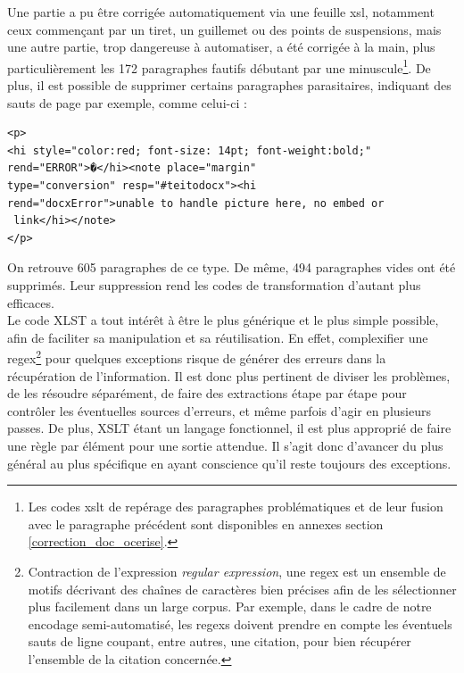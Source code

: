 \documentclass[a4paper,12pt,twoside]{book}
\begin{document}
Une partie a pu être corrigée automatiquement via une feuille xsl, notamment ceux commençant par un tiret, un guillemet ou des points de suspensions, mais une autre partie, trop dangereuse à automatiser, a été corrigée à la main, plus particulièrement les 172 paragraphes fautifs débutant par une minuscule\footnote{Les codes xslt de repérage des paragraphes problématiques et de leur fusion avec le paragraphe précédent sont disponibles en annexes section \ref{correction_doc_ocerise}.}.
De plus, il est possible de supprimer certains paragraphes parasitaires, indiquant des sauts de page par exemple, comme celui-ci : 
\begin{verbatim}
<p>
<hi style="color:red; font-size: 14pt; font-weight:bold;" 
rend="ERROR">�</hi><note place="margin" 
type="conversion" resp="#teitodocx"><hi
rend="docxError">unable to handle picture here, no embed or
 link</hi></note>
</p>
\end{verbatim}
On retrouve 605 paragraphes de ce type. De même, 494 paragraphes vides ont été supprimés. Leur suppression rend les codes de transformation d’autant plus efficaces. \\

Le code XLST a tout intérêt à être le plus générique et le plus simple possible, afin de faciliter sa manipulation et sa réutilisation. En effet, complexifier une regex\footnote{Contraction de l'expression \textit{regular expression}, une regex est un ensemble de motifs décrivant des chaînes de caractères bien précises afin de les sélectionner plus facilement dans un large corpus. Par exemple, dans le cadre de notre encodage semi-automatisé, les regexs doivent prendre en compte les éventuels sauts de ligne coupant, entre autres, une citation, pour bien récupérer l'ensemble de la citation concernée.} pour quelques exceptions risque de générer des erreurs dans la récupération de l'information. Il est donc plus pertinent de diviser les problèmes, de les résoudre séparément, de faire des extractions étape par étape pour contrôler les éventuelles sources d'erreurs, et même parfois d'agir en plusieurs passes. De plus, XSLT étant un langage fonctionnel, il est plus approprié de faire une règle par élément pour une sortie attendue. Il s'agit donc d'avancer du plus général au plus spécifique en ayant conscience qu'il reste toujours des exceptions.\\
\end{document}
